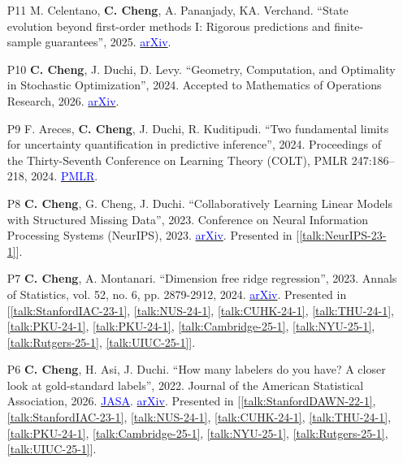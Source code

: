 \documentclass[10pt, a4paper]{article}
\makeatletter
\def\namedlabel#1#2{\begingroup
	#2%
	\def\@currentlabel{#2}%
	\phantomsection\label{#1}\endgroup
}
\makeatother
\begin{document}
\begin{enumerate}
	\item[\namedlabel{pub:SEBeyondI}{P11}] M. Celentano, \textbf{C. Cheng}, A. Pananjady, KA. Verchand. ``State evolution beyond first-order methods I: Rigorous predictions and finite-sample guarantees'', 2025. \href{https://arxiv.org/abs/2507.19611}{\textcolor{blue}{arXiv}}.
	\item[\namedlabel{pub:GeometryComputation}{P10}] \textbf{C. Cheng}, J. Duchi, D. Levy. ``Geometry, Computation, and Optimality in Stochastic Optimization'', 2024. Accepted to Mathematics of Operations Research, 2026. \href{https://arxiv.org/abs/1909.10455}{\textcolor{blue}{arXiv}}.
	\item[\namedlabel{pub:TwoFundamental}{P9}] F. Areces, \textbf{C. Cheng}, J. Duchi, R. Kuditipudi. ``Two fundamental limits for uncertainty quantification in predictive inference'', 2024. Proceedings of the Thirty-Seventh Conference on Learning Theory (COLT), PMLR 247:186--218, 2024. \href{https://proceedings.mlr.press/v247/areces24a.html}{\textcolor{blue}{PMLR}}.
	\item[\namedlabel{pub:CollaborativelyLearning}{P8}] \textbf{C. Cheng}, G. Cheng, J. Duchi. ``Collaboratively Learning Linear Models with Structured Missing Data'', 2023. Conference on Neural Information Processing Systems (NeurIPS), 2023. \href{https://arxiv.org/abs/2307.11947}{\textcolor{blue}{arXiv}}. Presented in [\ref{talk:NeurIPS-23-1}].
	\item[\namedlabel{pub:DimensionFree}{P7}] \textbf{C. Cheng}, A. Montanari. ``Dimension free ridge regression'', 2023. Annals of Statistics, vol. 52, no. 6, pp. 2879-2912, 2024. \href{https://arxiv.org/abs/2210.08571}{\textcolor{blue}{arXiv}}. Presented in [\ref{talk:StanfordIAC-23-1}, \ref{talk:NUS-24-1}, \ref{talk:CUHK-24-1}, \ref{talk:THU-24-1}, \ref{talk:PKU-24-1}, \ref{talk:PKU-24-1}, \ref{talk:Cambridge-25-1}, \ref{talk:NYU-25-1}, \ref{talk:Rutgers-25-1}, \ref{talk:UIUC-25-1}].
	\item[\namedlabel{pub:HowMany}{P6}] \textbf{C. Cheng}, H. Asi, J. Duchi. ``How many labelers do you have? A closer look at gold-standard labels'', 2022. Journal of the American Statistical Association, 2026. \href{https://doi.org/10.1080/01621459.2026.2744433}{\textcolor{blue}{JASA}}. \href{https://arxiv.org/abs/2206.12041}{\textcolor{blue}{arXiv}}. Presented in [\ref{talk:StanfordDAWN-22-1}, \ref{talk:StanfordIAC-23-1}, \ref{talk:NUS-24-1}, \ref{talk:CUHK-24-1}, \ref{talk:THU-24-1}, \ref{talk:PKU-24-1}, \ref{talk:Cambridge-25-1}, \ref{talk:NYU-25-1}, \ref{talk:Rutgers-25-1}, \ref{talk:UIUC-25-1}].

\end{enumerate}
\end{document}
